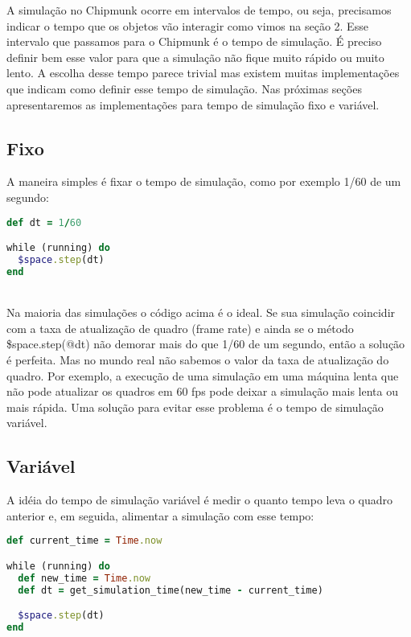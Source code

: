 A simulação no Chipmunk ocorre em intervalos de tempo, ou seja, precisamos indicar o tempo que os objetos vão interagir como vimos na seção 2. 
Esse intervalo que passamos para o Chipmunk é o tempo de simulação. É preciso definir bem esse valor para que a simulação não fique muito rápido 
ou muito lento. A escolha desse tempo parece trivial mas existem muitas implementações que indicam como definir esse tempo de simulação. Nas 
próximas seções apresentaremos as implementações para tempo de simulação fixo e variável.

\subsection{Fixo}

A maneira simples é fixar o tempo de simulação, como por exemplo 1/60 de um segundo:

\begin{lstlisting}[language=Ruby, caption=Implementação de tempo de simulação fixo]
def dt = 1/60

while (running) do
  $space.step(dt)
end
\end{lstlisting}

\ \\
Na maioria das simulações o código acima é o ideal. Se sua simulação coincidir com a taxa de atualização de quadro (frame rate) 
e ainda se o método \$space.step(@dt) não demorar mais do que 1/60 de um segundo, então a solução é perfeita. Mas no mundo real não sabemos
o valor da taxa de atualização do quadro. Por exemplo, a execução de uma simulação em uma máquina lenta que não pode atualizar os quadros em 60 fps 
pode deixar a simulação mais lenta ou mais rápida. Uma solução para evitar esse problema é o tempo de simulação variável.

\subsection{Variável}

A idéia do tempo de simulação variável é medir o quanto tempo leva o quadro anterior e, em seguida, alimentar a simulação com esse tempo: 

\begin{lstlisting}[language=Ruby, caption=Implementação de tempo de simulação variável]
def current_time = Time.now

while (running) do
  def new_time = Time.now
  def dt = get_simulation_time(new_time - current_time)

  $space.step(dt)
end

\end{lstlisting}

